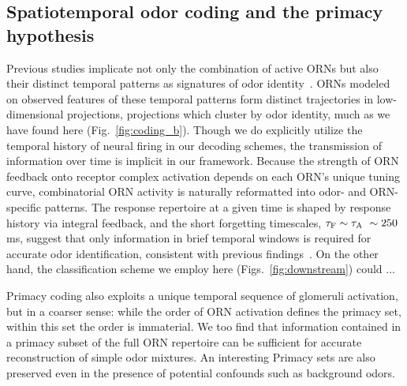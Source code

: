 \subsection{Spatiotemporal odor coding and the primacy hypothesis}

Previous studies implicate not only the combination of active ORNs but also their distinct temporal patterns as signatures of odor identity~\cite{stopfer_temporal_model, multiple_timescales_stopfer, stopfer_nat_neuro, stopfer_temporal_channel}. ORNs modeled on observed features of these temporal patterns form distinct trajectories in low-dimensional projections, projections which cluster by odor identity, much as we have found here (Fig.~\ref{fig:coding_b}). Though we do explicitly utilize the temporal history of neural firing in our decoding schemes, the transmission of information over time is implicit in our framework. Because the strength of ORN feedback onto receptor complex activation
depends on each ORN's unique tuning curve, combinatorial ORN activity is naturally reformatted into odor- and ORN-specific patterns. The response repertoire at a given time is shaped by response history via integral feedback, and the short forgetting timescales, $\tau_{\textup F} \sim \tau_{\textup A} ~ \sim 250$ ms, suggest that only information in brief temporal windows is required for accurate odor identification, consistent with previous findings~\cite{stopfer_nat_neuro}. On the other hand, the classification scheme we employ here (Figs.~\ref{fig:downstream}) could ...



Primacy coding also exploits a unique temporal sequence of glomeruli activation, but in a coarser sense: while the order of ORN activation defines the primacy set, within this set the order is immaterial. We too find that information contained in a primacy subset of the full ORN repertoire can be sufficient for accurate reconstruction of simple odor mixtures. An interesting Primacy sets are also preserved even in the presence of potential confounds such as background odors. 

